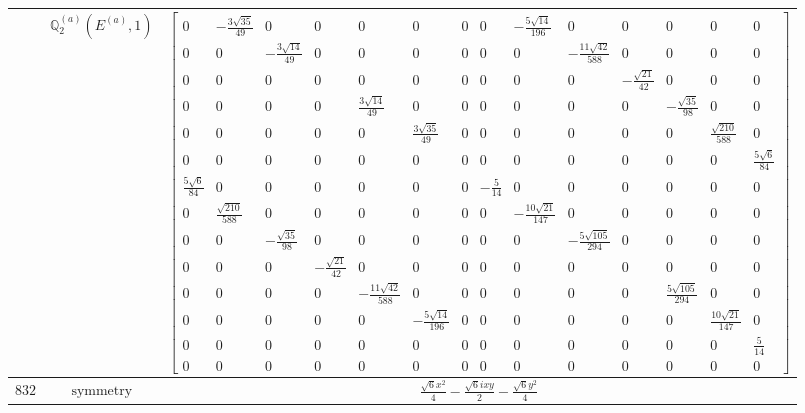 \documentclass[fleqn,8pt,landscape]{jsarticle}
\begin{document}
\begin{longtable}{ccc}
$  $ & $ \mathbb{Q}_{2}^{(a)}(E^{(a)},1) $ & $ \begin{bmatrix} 0 & - \frac{3 \sqrt{35}}{49} & 0 & 0 & 0 & 0 & 0 & 0 & - \frac{5 \sqrt{14}}{196} & 0 & 0 & 0 & 0 & 0 \\ 0 & 0 & - \frac{3 \sqrt{14}}{49} & 0 & 0 & 0 & 0 & 0 & 0 & - \frac{11 \sqrt{42}}{588} & 0 & 0 & 0 & 0 \\ 0 & 0 & 0 & 0 & 0 & 0 & 0 & 0 & 0 & 0 & - \frac{\sqrt{21}}{42} & 0 & 0 & 0 \\ 0 & 0 & 0 & 0 & \frac{3 \sqrt{14}}{49} & 0 & 0 & 0 & 0 & 0 & 0 & - \frac{\sqrt{35}}{98} & 0 & 0 \\ 0 & 0 & 0 & 0 & 0 & \frac{3 \sqrt{35}}{49} & 0 & 0 & 0 & 0 & 0 & 0 & \frac{\sqrt{210}}{588} & 0 \\ 0 & 0 & 0 & 0 & 0 & 0 & 0 & 0 & 0 & 0 & 0 & 0 & 0 & \frac{5 \sqrt{6}}{84} \\ \frac{5 \sqrt{6}}{84} & 0 & 0 & 0 & 0 & 0 & 0 & - \frac{5}{14} & 0 & 0 & 0 & 0 & 0 & 0 \\ 0 & \frac{\sqrt{210}}{588} & 0 & 0 & 0 & 0 & 0 & 0 & - \frac{10 \sqrt{21}}{147} & 0 & 0 & 0 & 0 & 0 \\ 0 & 0 & - \frac{\sqrt{35}}{98} & 0 & 0 & 0 & 0 & 0 & 0 & - \frac{5 \sqrt{105}}{294} & 0 & 0 & 0 & 0 \\ 0 & 0 & 0 & - \frac{\sqrt{21}}{42} & 0 & 0 & 0 & 0 & 0 & 0 & 0 & 0 & 0 & 0 \\ 0 & 0 & 0 & 0 & - \frac{11 \sqrt{42}}{588} & 0 & 0 & 0 & 0 & 0 & 0 & \frac{5 \sqrt{105}}{294} & 0 & 0 \\ 0 & 0 & 0 & 0 & 0 & - \frac{5 \sqrt{14}}{196} & 0 & 0 & 0 & 0 & 0 & 0 & \frac{10 \sqrt{21}}{147} & 0 \\ 0 & 0 & 0 & 0 & 0 & 0 & 0 & 0 & 0 & 0 & 0 & 0 & 0 & \frac{5}{14} \\ 0 & 0 & 0 & 0 & 0 & 0 & 0 & 0 & 0 & 0 & 0 & 0 & 0 & 0 \end{bmatrix} $ \\ \hline
$ 832 $ & $ \text{symmetry} $ & $ \frac{\sqrt{6} x^{2}}{4} - \frac{\sqrt{6} i x y}{2} - \frac{\sqrt{6} y^{2}}{4} $ \\

\end{longtable}
\end{document}
